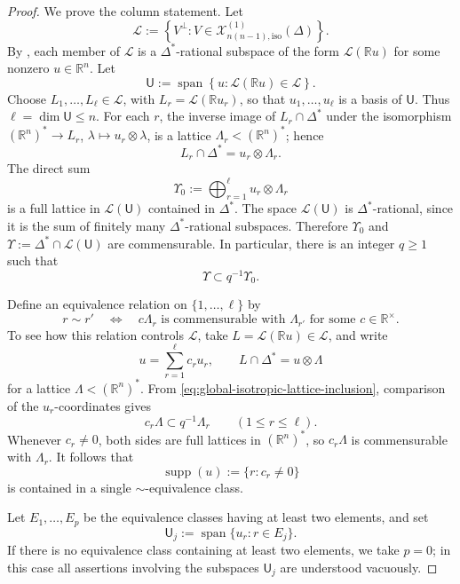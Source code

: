 \documentclass[reqno,11pt]{amsart}
\numberwithin{equation}{section}
\theoremstyle{definition}
\theoremstyle{remark}
\newcommand{\R}{\mathbb R}
\begin{document}
\begin{proof}
We prove the column statement. Let
$$
\mathscr L
:=
\left\{
V^\perp:
V\in\mathcal X^{(1)}_{n(n-1),\mathrm{iso}}(\Delta)
\right\}.
$$
By , each member of $\mathscr L$ is
a $\Delta^*$-rational subspace of the form
$\mathcal{L}(\mathbb Ru)$ for some nonzero $u\in\R^n$. Let
$$
\mathsf U:=\operatorname{span}\left\{
 u:\mathcal{L}(\mathbb Ru)\in\mathscr L
\right\}.
$$
Choose $L_1,\ldots,L_\ell\in\mathscr L$, with
${L}_r=\mathcal{L}(\mathbb Ru_r)$, so that $u_1,\ldots,u_\ell$ is a basis of
$\mathsf U$. Thus $\ell=\dim \mathsf U\le n$. For each $r$, the inverse image of ${L}_r\cap\Delta^*$ under the
isomorphism $(\R^n)^*\to {L}_r$, $\lambda\mapsto u_r\otimes\lambda$,
is a lattice $\Lambda_r<(\R^n)^*$; hence
$$
{L}_r\cap\Delta^*=u_r\otimes\Lambda_r.
$$
The direct sum
$$
\Upsilon_0
:=
\bigoplus_{r=1}^{\ell}u_r\otimes\Lambda_r
$$
is a full lattice in $\mathcal{L}(\mathsf U)$ contained in $\Delta^*$. The space
$\mathcal{L}(\mathsf U)$ is $\Delta^*$-rational, since it is the sum of finitely many
$\Delta^*$-rational subspaces. Therefore $\Upsilon_0$ and
$\Upsilon:=\Delta^*\cap \mathcal{L}(\mathsf U)$ are commensurable. In particular, there is
an integer $q\ge1$ such that
\begin{equation}\label{eq:global-isotropic-lattice-inclusion}
\Upsilon\subset q^{-1}\Upsilon_0.
\end{equation}

Define an equivalence relation on $\{1,\ldots,\ell\}$ by
$$
r\sim r'
\quad\Longleftrightarrow\quad
c\Lambda_r\text{ is commensurable with }\Lambda_{r'}
\text{ for some }c\in\R^\times.
$$
To see how this relation controls $\mathscr L$, take
$L=\mathcal{L}(\mathbb Ru)\in\mathscr L$, and write
$$
u=\sum_{r=1}^{\ell}c_ru_r,
\qquad
L\cap\Delta^*=u\otimes\Lambda
$$
for a lattice $\Lambda<(\R^n)^*$. From
\eqref{eq:global-isotropic-lattice-inclusion}, comparison of the
$u_r$-coordinates gives
$$
c_r\Lambda\subset q^{-1}\Lambda_r
\qquad(1\le r\le\ell).
$$
Whenever $c_r\ne0$, both sides are full lattices in $(\R^n)^*$, so
$c_r\Lambda$ is commensurable with $\Lambda_r$. It follows that
$$
\operatorname{supp}(u):=\{r:c_r\ne0\}
$$
is contained in a single $\sim$-equivalence class.

Let $E_1,\ldots,E_p$ be the equivalence classes having at least two
elements, and set
$$
\mathsf U_j:=\operatorname{span}\{u_r:r\in E_j\}.
$$
If there is no equivalence class containing at least two elements, we
take $p=0$; in this case all assertions involving the subspaces
$\mathsf U_j$ are understood vacuously. 


\end{proof}
\end{document}
